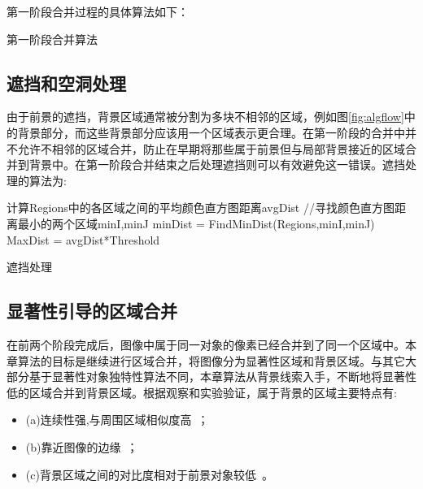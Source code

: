 第一阶段合并过程的具体算法如下：



\renewcommand{\algorithmcfname}{算法}
\begin{algorithm}
\LinesNumbered
{}

\label{algMergeP1}
\caption{第一阶段合并算法}
\end{algorithm}

\subsection{遮挡和空洞处理}
\label{subsec:mergeP2}

由于前景的遮挡，背景区域通常被分割为多块不相邻的区域，例如图\ref{fig:algflow}中的背景部分，而这些背景部分应该用一个区域表示更合理。在第一阶段的合并中并不允许不相邻的区域合并，防止在早期将那些属于前景但与局部背景接近的区域合并到背景中。在第一阶段合并结束之后处理遮挡则可以有效避免这一错误。遮挡处理的算法为:
\renewcommand{\algorithmcfname}{算法}
\begin{algorithm}
\LinesNumbered
{}
    计算Regions中的各区域之间的平均颜色直方图距离avgDist\;
    //寻找颜色直方图距离最小的两个区域minI,minJ\;
    minDist = FindMinDist(Regions,minI,minJ)\;
    MaxDist = avgDist*Threshold\;


\label{algMergeP2}
\caption{遮挡处理}
\end{algorithm}

\subsection{显著性引导的区域合并}
\label{subsec:mergeP3}

在前两个阶段完成后，图像中属于同一对象的像素已经合并到了同一个区域中。本章算法的目标是继续进行区域合并，将图像分为显著性区域和背景区域。与其它大部分基于显著性对象独特性算法不同，本章算法从背景线索入手，不断地将显著性低的区域合并到背景区域。根据观察和实验验证，属于背景的区域主要特点有:
\begin{itemize}
\item (a)连续性强,与周围区域相似度高~\cite{geodesicDistance}；
\item (b)靠近图像的边缘~\cite{backgroundPrior}；
\item (c)背景区域之间的对比度相对于前景对象较低~\cite{geodesicDistance}。
\end{itemize}

